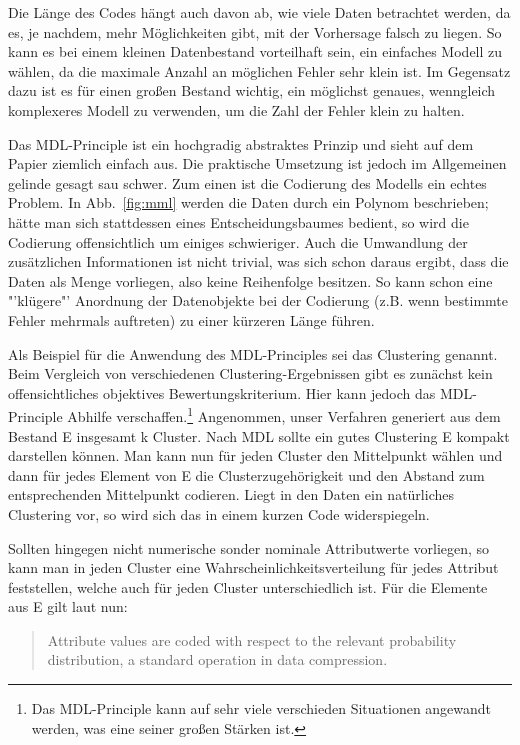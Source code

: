 Die Länge des Codes hängt auch davon ab, wie viele Daten betrachtet werden, da es,
je nachdem, mehr Möglichkeiten gibt, mit der Vorhersage falsch zu liegen.
So kann es bei einem kleinen Datenbestand vorteilhaft sein, ein einfaches Modell
zu wählen, da die maximale Anzahl an möglichen Fehler sehr klein ist. Im Gegensatz
dazu ist es für einen großen Bestand wichtig, ein möglichst genaues, wenngleich komplexeres
Modell zu verwenden, um die Zahl der Fehler klein zu halten.

Das MDL-Principle ist ein hochgradig abstraktes Prinzip und sieht auf dem Papier
ziemlich einfach aus. Die praktische Umsetzung ist jedoch im Allgemeinen gelinde
gesagt sau schwer. Zum einen ist die Codierung des Modells ein echtes Problem.
In Abb.~\ref{fig:mml} werden die Daten durch ein Polynom beschrieben;
hätte man sich stattdessen eines Entscheidungsbaumes bedient, so wird die
Codierung offensichtlich um einiges schwieriger. Auch die Umwandlung der 
zusätzlichen Informationen ist nicht trivial, was sich schon daraus ergibt, dass
die Daten als Menge vorliegen, also keine Reihenfolge besitzen. 
So kann schon eine "'klügere"'
Anordnung der Datenobjekte bei der Codierung (z.B. wenn bestimmte Fehler mehrmals
auftreten) zu einer kürzeren Länge führen. 

Als Beispiel für die Anwendung des MDL-Principles sei das Clustering genannt.
Beim Vergleich von verschiedenen Clustering-Ergebnissen
gibt es zunächst kein offensichtliches objektives Bewertungskriterium.
Hier kann jedoch das MDL-Principle Abhilfe verschaffen.\footnote{Das MDL-Principle
kann auf sehr viele verschieden Situationen angewandt werden, was eine seiner 
großen Stärken ist.} Angenommen, unser Verfahren generiert aus dem Bestand E insgesamt
k Cluster. Nach MDL sollte ein gutes Clustering E kompakt darstellen können. Man
kann nun für jeden Cluster den Mittelpunkt wählen und dann für jedes Element von
E die Clusterzugehörigkeit und den Abstand zum entsprechenden Mittelpunkt codieren.
Liegt in den Daten ein natürliches Clustering vor, so wird sich das in einem 
kurzen Code widerspiegeln.

Sollten hingegen nicht numerische sonder nominale Attributwerte vorliegen, so
kann man in jeden Cluster eine Wahrscheinlichkeitsverteilung für jedes Attribut
feststellen, welche auch für jeden Cluster unterschiedlich ist. Für die Elemente aus
E gilt laut \citet{Witten11} nun:
\begin{quote}
	\glqq Attribute values are coded with respect to the relevant probability
	distribution, a standard operation in data compression.\grqq
\end{quote}